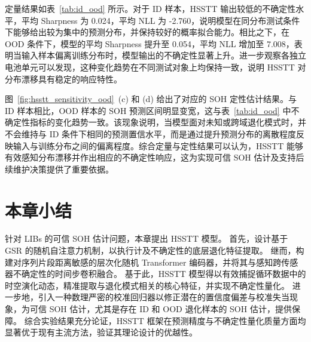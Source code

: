 定量结果如表~\ref{tab:id_ood} 所示。对于 ID 样本，HSSTT 输出较低的不确定性水平，平均 Sharpness 为 0.024，平均 NLL 为 -2.760，说明模型在同分布测试条件下能够给出较为集中的预测分布，并保持较好的概率拟合能力。相比之下，在 OOD 条件下，模型的平均 Sharpness 提升至 0.054，平均 NLL 增加至 7.008，表明当输入样本偏离训练分布时，模型输出的不确定性显著上升。进一步观察各独立电池单元可以发现，这种变化趋势在不同测试对象上均保持一致，说明 HSSTT 对分布漂移具有稳定的响应特性。

图~\ref{fig:hsstt_sensitivity_ood}~(c) 和 (d) 给出了对应的 SOH 定性估计结果。与 ID 样本相比，OOD 样本的 SOH 预测区间明显变宽，这与表~\ref{tab:id_ood} 中不确定性指标的变化趋势一致。该现象说明，当模型面对未知或跨域退化模式时，并不会维持与 ID 条件下相同的预测置信水平，而是通过提升预测分布的离散程度反映输入与训练分布之间的偏离程度。综合定量与定性结果可以认为，HSSTT 能够有效感知分布漂移并作出相应的不确定性响应，这为实现可信 SOH 估计及支持后续维护决策提供了重要依据。

\section{本章小结}\label{sec:HSSTT_conclusion}

针对 LIBs 的可信 SOH 估计问题，本章提出 HSSTT 模型。
首先，设计基于 GSR 的随机自注意力机制，以执行计及不确定性的底层退化特征提取。
继而，构建对序列片段距离敏感的层次化随机 Transformer 编码器，并将其与感知跨传感器不确定性的时间步卷积融合。
基于此，HSSTT 模型得以有效捕捉循环数据中的时空演化动态，精准提取与退化模式相关的核心特征，并实现不确定性量化。
进一步地，引入一种数理严密的校准回归器以修正潜在的置信度偏差与校准失当现象，为可信 SOH 估计，尤其是存在 ID 和 OOD 退化样本的 SOH 估计，提供保障。
综合实验结果充分论证，HSSTT 框架在预测精度与不确定性量化质量方面均显著优于现有主流方法，验证其理论设计的优越性。

